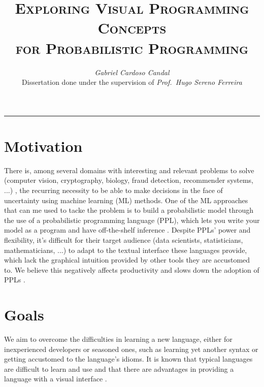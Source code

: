 \documentclass[9pt,a4paper]{extarticle}
\begin{document}
\title{\vspace*{-8mm}\textbf{\textsc{Exploring Visual Programming Concepts\\for Probabilistic Programming}}}
\author{\emph{Gabriel Cardoso Candal}\\[2mm]
\small{Dissertation done under the supervision of \emph{Prof.\ Hugo Sereno Ferreira}}}
\date{}
\maketitle
\thispagestyle{empty}

\vspace*{-4mm}\noindent\rule{\textwidth}{0.4pt}\vspace*{4mm}

\begin{multicols}{2}

\section{Motivation}

There is, among several domains with interesting and relevant problems to solve (computer vision,
cryptography, biology, fraud detection, recommender systems, ...) \cite{intml}, the recurring
necessity to be able to make decisions in the face of uncertainty using machine
learning (ML) methods.
One of the ML approaches that can me used to tacke the problem is to build a
probabilistic model through the use of a probabilistic programming language (PPL),
which lets you write your model as a program and have off-the-shelf inference \cite{Prekopa2003}.
Despite PPLs’ power and flexibility, it's difficult for their target audience
(data scientists, statisticians, mathematicians, ...) to adapt to the textual
interface these languages provide, which lack the graphical intuition provided
by other tools they are accustomed to. We believe this negatively affects
productivity and slows down the adoption of PPLs \cite{darpa}.

\section{Goals}

We aim to overcome
the difficulties in learning a new language, either for inexperienced developers or seasoned
ones, such as learning yet another syntax or getting accustomed to the language’s idioms. It is
known that typical languages are difficult to learn and use \cite{Lewis1987} and that there are advantages in
providing a language with a visual interface \cite{dfbeg}.


\end{multicols}
\end{document}

